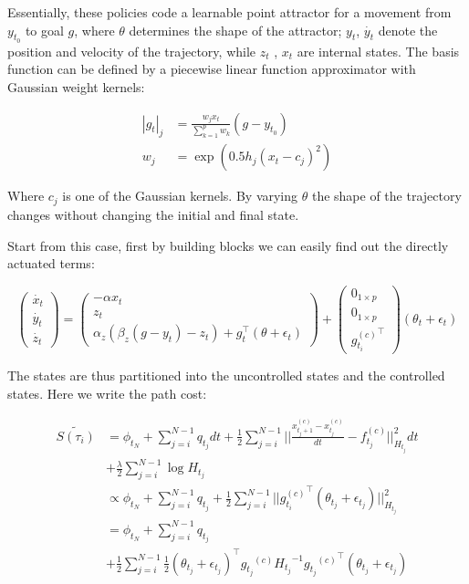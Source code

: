 \documentclass[journal]{IEEEtran}
\begin{document}
Essentially, these policies code a learnable point attractor for a movement from $y_{t_0}$ to goal $g$, where $\theta$ determines the shape of the attractor; 
$y_t$, $\dot{y_t}$ denote the position and velocity of the trajectory, while $z_t$ , $x_t$ are internal states. The basis function can be defined by a piecewise
linear function approximator with Gaussian weight kernels:

\begin{equation}
  \begin{aligned}
     |g_t|_j &= \frac{w_jx_t}{\sum_{k=1}^{p}w_k}(g-y_{t_0}) \\
     w_j & = \exp(0.5 h_j(x_t - c_j )^2) \nonumber 
  \end{aligned}
\end{equation}

Where $c_j$ is one of the Gaussian kernels. By varying $\theta$ the shape of the trajectory changes without changing the initial and final state.  

Start from this case, first by building blocks we can easily find out the directly actuated terms:

\begin{equation}
\begin{pmatrix} \dot{x_t} \\ \dot{y_t} \\ \dot{z_t} \end{pmatrix} = \begin{pmatrix} -\alpha x_t \\ z_t \\ \alpha_z(\beta_z(g-y_t)- z_t)+ g_t^{\top}(\theta + \epsilon_t) \end{pmatrix} + \begin{pmatrix} 0_{ 1 \times p} \\ 0_{ 1 \times p} \\ {g_{t_i}^{(c)}}^{\top}  \end{pmatrix}(\theta_t + \epsilon_t)
\end{equation}

The states are thus partitioned into the uncontrolled states and the controlled states. Here we write the path cost:


\begin{equation}
  \begin{aligned}
    \tilde{S(\tau_i)}& = \phi_{t_N}+\sum_{j=i}^{N-1}q_{t_j}dt + \frac{1}{2}\sum_{j=i}^{N-1}|| \frac{x_{t_j+1}^{(c)} - x_{t_j}^{(c)}}{dt} - f_{t_j}^{(c)}||^2_{H_{t_j}} dt \\ &+ \frac{\lambda}{2} \sum_{j = i}^{N-1} \log H_{t_j} \\
    & \propto \phi_{t_N}+\sum_{j=i}^{N-1}q_{t_j} + \frac{1}{2}\sum_{j=i}^{N-1}|| {g_{t_i}^{(c)}}^{\top} (\theta_{t_j} + \epsilon_{t_j})||^2_{H_{t_j}}  \\
    & = \phi_{t_N}+\sum_{j=i}^{N-1}q_{t_j} \\ & + \frac{1}{2}\sum_{j=i}^{N-1}  \frac{1}{2}(\theta_{t_j} + \epsilon_{t_j})^{\top}{g_{t_j}}^{(c)}{H_{t_j}}^{-1}{{g_{t_j}}^{(c)}}^{\top} (\theta_{t_j} + \epsilon_{t_j})\\ \nonumber
  \end{aligned}
\end{equation}
\end{document}
